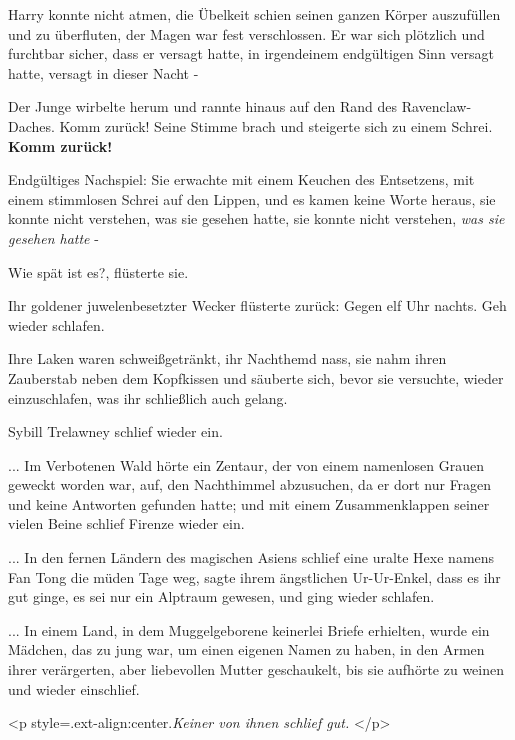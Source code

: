 Harry konnte nicht atmen, die Übelkeit schien seinen ganzen Körper auszufüllen
und zu überfluten, der Magen war fest verschlossen. Er war sich plötzlich und
furchtbar sicher, dass er versagt hatte, in irgendeinem endgültigen Sinn versagt
hatte, versagt in dieser Nacht -

Der Junge wirbelte herum und rannte hinaus auf den Rand des Ravenclaw-Daches.
\glqq Komm zurück!\grqq{} Seine Stimme brach und steigerte sich zu einem Schrei.
\glqq \textbf{Komm zurück!}\grqq{}

Endgültiges Nachspiel: Sie erwachte mit einem Keuchen des Entsetzens, mit einem
stimmlosen Schrei auf den Lippen, und es kamen keine Worte heraus, sie konnte
nicht verstehen, was sie gesehen hatte, sie konnte nicht verstehen, \emph{was
sie gesehen hatte} -

\glqq Wie spät ist es?\grqq{}, flüsterte sie.

Ihr goldener juwelenbesetzter Wecker flüsterte zurück: \glqq Gegen elf Uhr
nachts. Geh wieder schlafen.\grqq{}

Ihre Laken waren schweißgetränkt, ihr Nachthemd nass, sie nahm ihren Zauberstab
neben dem Kopfkissen und säuberte sich, bevor sie versuchte, wieder
einzuschlafen, was ihr schließlich auch gelang.

Sybill Trelawney schlief wieder ein.

... Im Verbotenen Wald hörte ein Zentaur, der von einem namenlosen Grauen
geweckt worden war, auf, den Nachthimmel abzusuchen, da er dort nur Fragen und
keine Antworten gefunden hatte; und mit einem Zusammenklappen seiner vielen
Beine schlief Firenze wieder ein.

... In den fernen Ländern des magischen Asiens schlief eine uralte Hexe namens
Fan Tong die müden Tage weg, sagte ihrem ängstlichen Ur-Ur-Enkel, dass es ihr
gut ginge, es sei nur ein Alptraum gewesen, und ging wieder schlafen.

... In einem Land, in dem Muggelgeborene keinerlei Briefe erhielten, wurde ein
Mädchen, das zu jung war, um einen eigenen Namen zu haben, in den Armen ihrer
verärgerten, aber liebevollen Mutter geschaukelt, bis sie aufhörte zu weinen und
wieder einschlief.

<p style=\grqq{}.ext-align:center\grqq{}.\emph{Keiner von ihnen schlief gut.
}</p>

